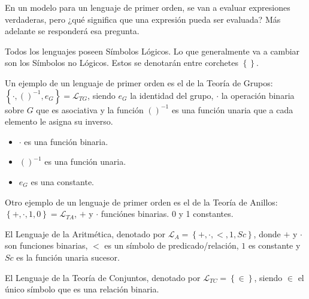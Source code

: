 \documentclass[12pt]{report}
\newcounter{it}
\theoremstyle{largebreak}
\begin{document}
    \begin{obs}
        En un modelo para un lenguaje de primer orden, se van a evaluar expresiones verdaderas, pero ¿qué significa que una expresión pueda ser evaluada? Más adelante se responderá esa pregunta.
    \end{obs}

    \begin{obs}
        Todos los lenguajes poseen Símbolos Lógicos. Lo que generalmente va a cambiar son los Símbolos no Lógicos. Estos se denotarán entre corchetes $\left\{\right\}$.
    \end{obs}

    \begin{exa}
        Un ejemplo de un lenguaje de primer orden es el de la Teoría de Grupos: $\left\{\cdot,()^{-1},e_G \right\}=\mathcal{L}_{TG}$, siendo $e_G$ la identidad del grupo, $\cdot$ la operación binaria sobre $G$ que es asociativa y la función $()^{-1}$ es una función unaria que a cada elemento le asigna su inverso.
        \begin{itemize}
            \item $\cdot$ es una función binaria.
            \item $()^{-1}$ es una función unaria.
            \item $e_G$ es una constante.
        \end{itemize}
    \end{exa}

    \begin{exa}
        Otro ejemplo de un lenguaje de primer orden es el de la Teoría de Anillos: $\left\{+,\cdot,1,0 \right\}=\mathcal{L}_{TA}$, $+$ y $\cdot$ funciónes binarias. 0 y 1 constantes.
    \end{exa}
    
    \begin{exa}
        El Lenguaje de la Aritmética, denotado por $\mathcal{L}_A=\left\{+,\cdot,<,1,Sc \right\}$, donde $+$ y $\cdot$ son funciones binarias, $<$ es un símbolo de predicado/relación, $1$ es constante y $Sc$ es la función unaria sucesor.
    \end{exa}

    \begin{exa}
        El Lenguaje de la Teoría de Conjuntos, denotado por $\mathcal{L}_{TC}=\left\{\in\right\}$, siendo $\in$ el único símbolo que es una relación binaria.
    \end{exa}
\end{document}
